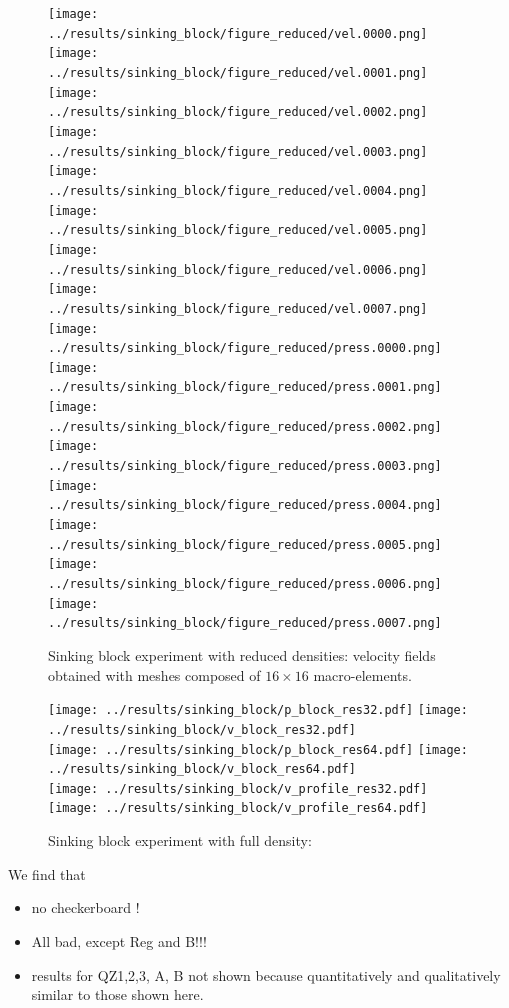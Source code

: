 \documentclass[a4paper]{article}
\begin{document}
\begin{figure}[t]
\centering
\texttt{[image: ../results/sinking\_block/figure\_reduced/vel.0000.png]}
\texttt{[image: ../results/sinking\_block/figure\_reduced/vel.0001.png]}
\texttt{[image: ../results/sinking\_block/figure\_reduced/vel.0002.png]}
\texttt{[image: ../results/sinking\_block/figure\_reduced/vel.0003.png]}\\
\texttt{[image: ../results/sinking\_block/figure\_reduced/vel.0004.png]}
\texttt{[image: ../results/sinking\_block/figure\_reduced/vel.0005.png]}
\texttt{[image: ../results/sinking\_block/figure\_reduced/vel.0006.png]}
\texttt{[image: ../results/sinking\_block/figure\_reduced/vel.0007.png]}\\
\texttt{[image: ../results/sinking\_block/figure\_reduced/press.0000.png]}
\texttt{[image: ../results/sinking\_block/figure\_reduced/press.0001.png]}
\texttt{[image: ../results/sinking\_block/figure\_reduced/press.0002.png]}
\texttt{[image: ../results/sinking\_block/figure\_reduced/press.0003.png]}\\
\texttt{[image: ../results/sinking\_block/figure\_reduced/press.0004.png]}
\texttt{[image: ../results/sinking\_block/figure\_reduced/press.0005.png]}
\texttt{[image: ../results/sinking\_block/figure\_reduced/press.0006.png]}
\texttt{[image: ../results/sinking\_block/figure\_reduced/press.0007.png]}\\
\caption{Sinking block experiment with reduced densities: velocity fields 
obtained with meshes composed of $16\times 16$ macro-elements. \label{fig:dh2}}
\end{figure}






\begin{figure}
\centering
\texttt{[image: ../results/sinking\_block/p\_block\_res32.pdf]}
\texttt{[image: ../results/sinking\_block/v\_block\_res32.pdf]}\\
\texttt{[image: ../results/sinking\_block/p\_block\_res64.pdf]}
\texttt{[image: ../results/sinking\_block/v\_block\_res64.pdf]}\\
\texttt{[image: ../results/sinking\_block/v\_profile\_res32.pdf]}
\texttt{[image: ../results/sinking\_block/v\_profile\_res64.pdf]}
\caption{Sinking block experiment with full density: } \label{fig:resblock}
\end{figure}







We find that
\begin{itemize}
\item no checkerboard ! 
\item All bad, except Reg and B!!!
\item results for QZ1,2,3, A, B not shown because quantitatively and qualitatively similar to those shown here.
\end{itemize}
\end{document}

